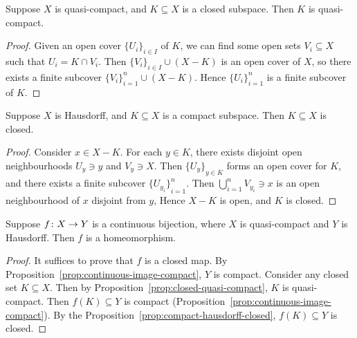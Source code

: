 \begin{proposition}\label{prop:closed-quasi-compact}
    Suppose \(X\) is quasi-compact, and \(K \subseteq X\) is a closed subspace.
    Then \(K\) is quasi-compact.
\end{proposition}
\begin{proof}
    Given an open cover \({\{U_i\}}_{i \in I}\) of \(K\),
    we can find some open sets \(V_i \subseteq X\) such that \(U_i = K \cap V_i\).
    Then \({\{V_i\}}_{i \in I} \cup (X-K)\) is an open cover of \(X\),
    so there exists a finite subcover \({\{V_i\}}_{i=1}^n \cup (X-K)\).
    Hence \({\{U_i\}}_{i=1}^n\) is a finite subcover of \(K\).
\end{proof}
\begin{proposition}\label{prop:compact-hausdorff-closed}
    Suppose \(X\) is Hausdorff, and \(K \subseteq X\) is a compact subspace.
    Then \(K \subseteq X\) is closed.
\end{proposition}
\begin{proof}
    Consider \(x \in X-K\).
    For each \(y \in K\), there exists disjoint open neighbourhoods \(U_y \ni y\) and \(V_y \ni X\).
    Then \({\{U_y\}}_{y \in K}\) forms an open cover for \(K\),
    and there exists a finite subcover \({\{U_{y_i}\}}_{i=1}^n\).
    Then \(\bigcup_{i=1}^n V_{y_i} \ni x\) is an open neighbourhood of \(x\) disjoint from \(y\),
    Hence \(X-K\) is open, and \(K\) is closed.
\end{proof}
\begin{corollary}
    Suppose \(f\colon X\to Y\) is a continuous bijection, where \(X\) is quasi-compact and \(Y\) is Hausdorff.
    Then \(f\) is a homeomorphism.
\end{corollary}
\begin{proof}
    It suffices to prove that \(f\) is a closed map.
    By Proposition~\ref{prop:continuous-image-compact}, \(Y\) is compact.
    Consider any closed set \(K \subseteq X\).
    Then by Proposition~\ref{prop:closed-quasi-compact}, \(K\) is quasi-compact.
    Then \(f(K) \subseteq Y\) is compact (Proposition~\ref{prop:continuous-image-compact}).
    By the Proposition~\ref{prop:compact-hausdorff-closed},
    \(f(K) \subseteq Y\) is closed.
\end{proof}

